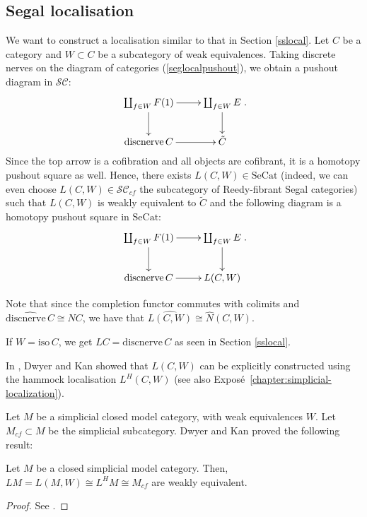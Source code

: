\begin{refsection}
\subsection{Segal localisation}
We want to construct a localisation similar to that in Section \ref{sslocal}. Let $C$ be a category and $W\subset C$ be a subcategory of weak equivalences. Taking discrete nerves on the diagram of categories (\ref{seglocalpushout}), we obtain a pushout diagram in $\mathcal{SC}$:
$$\xymatrix{\coprod_{f\in W}F(1)\ar[r]\ar[d]&\coprod_{f\in W}E\ar[d]\\\mathrm{discnerve}\,C\ar[r]&\tilde C}.$$
Since the top arrow is a cofibration and all objects are cofibrant, it is a homotopy pushout square as well. Hence, there exists $L(C,W)\in\mathrm{SeCat}$ (indeed, we can even choose $L(C,W)\in\mathcal{SC}_{cf}$ the subcategory of Reedy-fibrant Segal categories) such that $L(C,W)$ is weakly equivalent to $\tilde C$ and the following diagram is a homotopy pushout square in $\mathrm{SeCat}$:
$$\xymatrix{\coprod_{f\in W}F(1)\ar[r]\ar[d]&\coprod_{f\in W}E\ar[d]\\\mathrm{discnerve}\,C\ar[r]&L(C,W)}.$$

Note that since the completion functor commutes with colimits and $\widehat{\mathrm{discnerve}\,C}\cong NC$, we have that $\widehat{L(C,W)}\cong\hat N(C,W)$.

If $W=\mathrm{iso}\,C$, we get $LC=\mathrm{discnerve}\,C$ as seen in Section \ref{sslocal}.

In \cite{dkcomputing}, Dwyer and Kan showed that $L(C,W)$ can be explicitly constructed using the hammock localisation $L^H(C,W)$ (see also Expos\'e~\ref{chapter:simplicial-localization}).

Let $M$ be a simplicial closed model category, with weak equivalences $W$. Let $M_{cf}\subset M$ be the simplicial subcategory. Dwyer and Kan proved the following result:

\begin{thm}
Let $M$ be a closed simplicial model category. Then, $LM=L(M,W)\cong L^HM\cong M_{cf}$ are weakly equivalent.
\end{thm}
\begin{proof}
See \cite{dkfunction}.
\end{proof}


\end{refsection}
